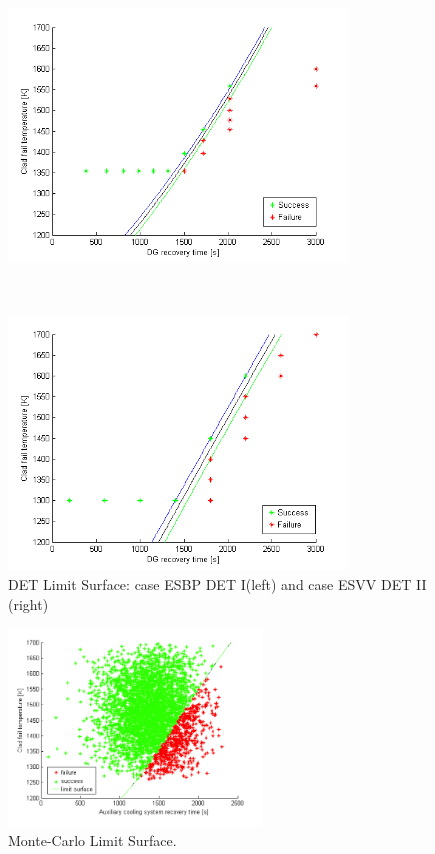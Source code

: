 \begin{figure}
 \begin{minipage}[b]{8.5cm}
   \centering
   \includegraphics[width=9cm]{figures/DET_LS_pb.png}
 \end{minipage}
 \ \hspace{2mm} \hspace{3mm} \
 \begin{minipage}[b]{8.5cm}
  \centering
   \includegraphics[width=9cm]{figures/DET_LS_var.png}
 \end{minipage}
\caption{DET Limit Surface: case ESBP DET I(left) and case  ESVV DET II (right)}
\label{fig:DET_LS}
\end{figure}
\begin{figure}[h]
   \centering
    \includegraphics[width=0.6\textwidth]{figures/MClimitSurface.png}
    \caption{Monte-Carlo Limit Surface.}
    \label{fig:MonteCarloLS}
\end{figure}

